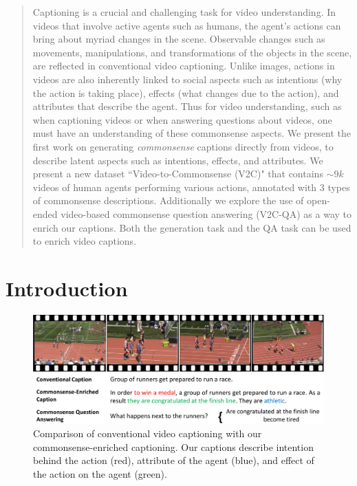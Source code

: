 

\begin{abstract}
Captioning is a crucial and challenging task for video understanding.  
In videos that involve active agents such as humans, the agent's actions can bring about myriad changes in the scene. 
Observable changes such as movements, manipulations, and transformations of the objects in the scene, are reflected in conventional video captioning.
Unlike images, actions in videos are also inherently linked to social aspects such as intentions (why the action is taking place), effects (what changes due to the action), and attributes that describe the agent. 
Thus for video understanding, such as when captioning videos or when answering questions about videos, one must have an understanding of these commonsense aspects.
We present the first work on generating \textit{commonsense} captions directly from videos, to describe latent aspects such as intentions, effects, and attributes.
We present a new dataset ``Video-to-Commonsense (V2C)" that contains $\sim9k$ videos of human agents performing various actions, annotated with 3 types of commonsense descriptions.
Additionally we explore the use of open-ended video-based commonsense question answering (V2C-QA) as a way to enrich our captions.
Both the generation task and the QA task can be used to enrich video captions.
\end{abstract}

\section{Introduction}
\begin{figure}
    \centering
    \includegraphics[width=0.9\linewidth]{v2c/fig/teaser_single.pdf}
    \caption{Comparison of conventional video captioning with our commonsense-enriched captioning. Our captions describe intention behind the action ({\color{red}red}), attribute of the agent ({\color{blue}blue}), and effect of the action on the agent ({\color{green}green}).}
    \label{fig:pipeline}
\end{figure}

